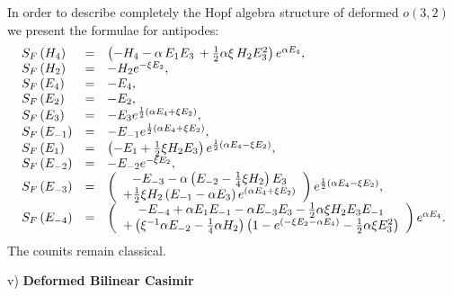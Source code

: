 \documentclass[a4paper,12pt,showkeys]{article}
\begin{document}
In order to describe completely the Hopf algebra structure of
 deformed $o(3,2)$ we
present the formulae for antipodes:
\begin{equation}
\begin{array}{lcl}
S_{F}\left( H_{4}\right)  & = & \left( -H_{4}-\alpha \,E_{1}E_{3}\,+\frac{1}{%
2}\alpha \xi \,H_{2}E_{3}^{2}\right) e^{\alpha {E}_{4}}, \\
S_{F}\left( H_{2}\right)  & = & -H_{2}e^{-\xi {E}_{2}}, \\
S_{F}\left( {E}_{4}\right)  & = & -{E}_{4}, \\
S_{F}\left( {E}_{2}\right)  & = & -{E}_{2}, \\
S_{F}\left( E_{3}\right)  & = & - E_{3}e^{\frac{1}{2}\left( \alpha {E}%
_{4}+ \xi {E}_{2}\right) }, \\
S_{F}\left( E_{-1}\right)  & = & -E_{-1}e^{\frac{1}{2}\left( \alpha {E%
}_{4} +\xi {E}_{2}\right) }, \\
S_{F}\left( E_{1}\right)  & = & \left( -E_{1}+\frac{1}{2}\xi
H_{2}E_{3}\right) e^{\frac{1}{2}\left( \alpha {E}_{4} - \xi {E}%
_{2}\right) }, \\
S_{F}\left( E_{-2}\right)  & = & -E_{-2}e^{-\xi {E}_{2}}, \\
S_{F}\left( E_{-3}\right)  & = & \left(
\begin{array}{c}
 -E_{-3}-\alpha \left( E_{-2}
-\frac{1}{4}\xi H_2 \right)E_{3} \\
+\frac{1}{2%
}\xi H_{2}\left( E_{-1}-\alpha E_{3}\right) e^{\left( \alpha {E}%
_{4}+\xi {E}_{2}\right) }
\end{array}
\right) e^{\frac{1}{2}\left( \alpha {E%
}_{4} - \xi {E}_{2}\right) }, \\
S_{F}\left( E_{-4}\right)  & = & \left(
\begin{array}{c}
-E_{-4}+\alpha E_{1}E_{-1}- \alpha E_{-3}E_{3}
-\frac{1}{2}\alpha \xi H_{2}E_{3}E_{-1}
\\
+\left( \xi ^{-1}\alpha E_{-2}-\frac{1}{4}\alpha H_{2}\right) \left(
1-e^{\left(- \xi {E}_{2}-\alpha {E}_{4}\right) }-\frac{1}{2}%
\alpha \xi E_{3}^{2}\right)
\end{array}
\right) e^{\alpha {E}_{4}}.
\end{array}
\end{equation}
The counits remain classical.

v) {\bf Deformed Bilinear Casimir}
\end{document}
